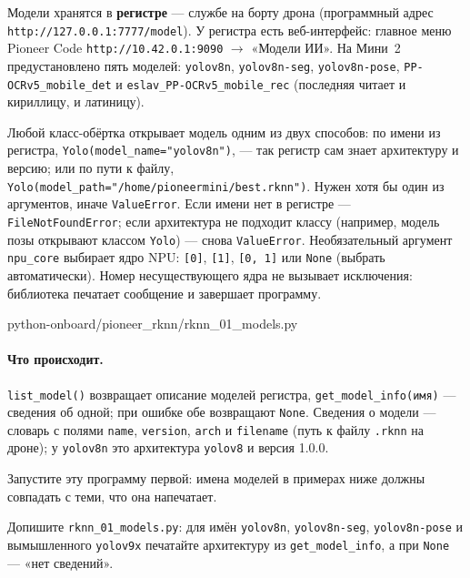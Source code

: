Модели хранятся в \textbf{регистре} --- службе на борту дрона (программный адрес \verb|http://127.0.0.1:7777/model|). У регистра есть веб-интерфейс: главное меню Pioneer Code \texttt{http://10.42.0.1:9090} $\to$ «Модели ИИ». На Мини~2 предустановлено пять моделей: \texttt{yolov8n}, \texttt{yolov8n-seg}, \texttt{yolov8n-pose}, \texttt{PP-OCRv5\_mobile\_det} и \texttt{eslav\_PP-OCRv5\_mobile\_rec} (последняя читает и кириллицу, и латиницу).

Любой класс-обёртка открывает модель одним из двух способов: по имени из регистра, \verb|Yolo(model_name="yolov8n")|, --- так регистр сам знает архитектуру и версию; или по пути к файлу, \verb|Yolo(model_path="/home/pioneermini/best.rknn")|. Нужен хотя бы один из аргументов, иначе \verb|ValueError|. Если имени нет в регистре --- \verb|FileNotFoundError|; если архитектура не подходит классу (например, модель позы открывают классом \verb|Yolo|) --- снова \verb|ValueError|. Необязательный аргумент \verb|npu_core| выбирает ядро NPU: \verb|[0]|, \verb|[1]|, \verb|[0, 1]| или \verb|None| (выбрать автоматически). Номер несуществующего ядра не вызывает исключения: библиотека печатает сообщение и завершает программу.

\begin{codefile}[python]{python-onboard/pioneer_rknn/rknn_01_models.py}
\end{codefile}

\paragraph{Что происходит.} \verb|list_model()| возвращает описание моделей регистра, \verb|get_model_info(имя)| --- сведения об одной; при ошибке обе возвращают \verb|None|. Сведения о модели --- словарь с полями \texttt{name}, \texttt{version}, \texttt{arch} и \texttt{filename} (путь к файлу \texttt{.rknn} на дроне); у \texttt{yolov8n} это архитектура \texttt{yolov8} и версия 1.0.0.

Запустите эту программу первой: имена моделей в примерах ниже должны совпадать с теми, что она напечатает.

\begin{taskbox}
Допишите \texttt{rknn\_01\_models.py}: для имён \texttt{yolov8n}, \texttt{yolov8n-seg}, \texttt{yolov8n-pose} и вымышленного \texttt{yolov9x} печатайте архитектуру из \verb|get_model_info|, а при \verb|None| --- «нет сведений».
\end{taskbox}

